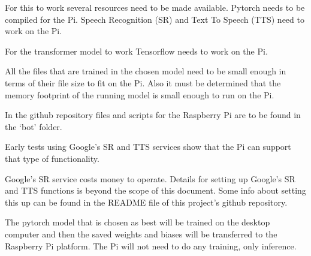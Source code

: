 For this to work several resources need to be made available. Pytorch
needs to be compiled for the Pi. Speech Recognition (\ac{SR}) and Text
To Speech (TTS) need to work on the Pi.

For the transformer model to work Tensorflow needs to work on the Pi.

All the files that are trained in the chosen model need to be small
enough in terms of their file size to fit on the Pi. Also it must
be determined that the memory footprint of the running model is small
enough to run on the Pi.

In the github repository files and scripts for the Raspberry Pi are
to be found in the \textquoteleft bot\textquoteright{} folder.

Early tests using Google\textquoteright s SR and TTS services show
that the Pi can support that type of functionality. 

Google's SR service costs money to operate. Details
for setting up Google's SR and TTS functions is beyond
the scope of this document. Some info about setting this up can be
found in the README file of this project\textquoteright s github
repository.

The pytorch model that is chosen as best will be trained on the
desktop computer and then the saved weights and biases will be transferred
to the Raspberry Pi platform. The Pi will not need to do any training,
only inference. 
\fi

